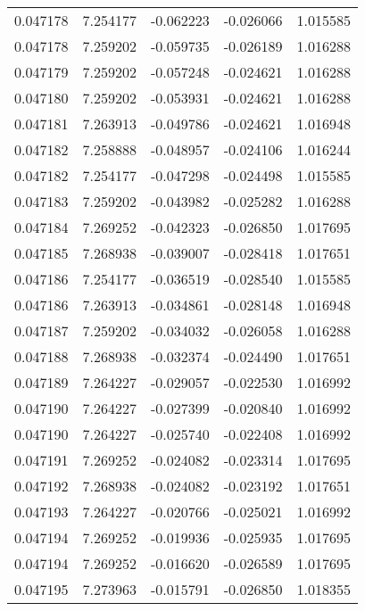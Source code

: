 \begin{tabular}{lrrrr}
0.047178    &  7.254177 & -0.062223 & -0.026066 &             1.015585 \\
0.047178    &  7.259202 & -0.059735 & -0.026189 &             1.016288 \\
0.047179    &  7.259202 & -0.057248 & -0.024621 &             1.016288 \\
0.047180    &  7.259202 & -0.053931 & -0.024621 &             1.016288 \\
0.047181    &  7.263913 & -0.049786 & -0.024621 &             1.016948 \\
0.047182    &  7.258888 & -0.048957 & -0.024106 &             1.016244 \\
0.047182    &  7.254177 & -0.047298 & -0.024498 &             1.015585 \\
0.047183    &  7.259202 & -0.043982 & -0.025282 &             1.016288 \\
0.047184    &  7.269252 & -0.042323 & -0.026850 &             1.017695 \\
0.047185    &  7.268938 & -0.039007 & -0.028418 &             1.017651 \\
0.047186    &  7.254177 & -0.036519 & -0.028540 &             1.015585 \\
0.047186    &  7.263913 & -0.034861 & -0.028148 &             1.016948 \\
0.047187    &  7.259202 & -0.034032 & -0.026058 &             1.016288 \\
0.047188    &  7.268938 & -0.032374 & -0.024490 &             1.017651 \\
0.047189    &  7.264227 & -0.029057 & -0.022530 &             1.016992 \\
0.047190    &  7.264227 & -0.027399 & -0.020840 &             1.016992 \\
0.047190    &  7.264227 & -0.025740 & -0.022408 &             1.016992 \\
0.047191    &  7.269252 & -0.024082 & -0.023314 &             1.017695 \\
0.047192    &  7.268938 & -0.024082 & -0.023192 &             1.017651 \\
0.047193    &  7.264227 & -0.020766 & -0.025021 &             1.016992 \\
0.047194    &  7.269252 & -0.019936 & -0.025935 &             1.017695 \\
0.047194    &  7.269252 & -0.016620 & -0.026589 &             1.017695 \\
0.047195    &  7.273963 & -0.015791 & -0.026850 &             1.018355 \\

\end{tabular}
